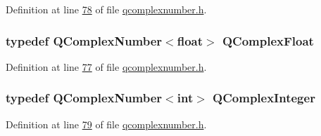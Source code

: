 Definition at line \hyperlink{a00114_source_l00078}{78} of file \hyperlink{a00114_source}{qcomplexnumber.\+h}.

\hypertarget{a00114_ad957a9578f5201ba6cd85e0369965a0e}{
\subsubsection[{Q\+Complex\+Float}]{\setlength{\rightskip}{0pt plus 5cm}typedef {\bf Q\+Complex\+Number}$<$float$>$ {\bf Q\+Complex\+Float}}}\label{a00114_ad957a9578f5201ba6cd85e0369965a0e}


Definition at line \hyperlink{a00114_source_l00077}{77} of file \hyperlink{a00114_source}{qcomplexnumber.\+h}.

\hypertarget{a00114_ae575bcbda7093edc173011db3fce5000}{
\subsubsection[{Q\+Complex\+Integer}]{\setlength{\rightskip}{0pt plus 5cm}typedef {\bf Q\+Complex\+Number}$<$int$>$ {\bf Q\+Complex\+Integer}}}\label{a00114_ae575bcbda7093edc173011db3fce5000}


Definition at line \hyperlink{a00114_source_l00079}{79} of file \hyperlink{a00114_source}{qcomplexnumber.\+h}.

